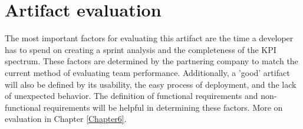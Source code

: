 \section{Artifact evaluation}

The most important factors for evaluating this artifact 
are the time a developer has to spend on creating a sprint
analysis and the completeness of the KPI spectrum. These factors are
determined by the partnering company to match the current method of evaluating
team performance.
Additionally, a 'good' artifact will also be defined by its usability, 
the easy process of deployment, and the lack of unexpected behavior. 
The definition of functional requirements and non-functional requirements will 
be helpful in determining these factors. 
More on evaluation in Chapter \ref{Chapter6}.
